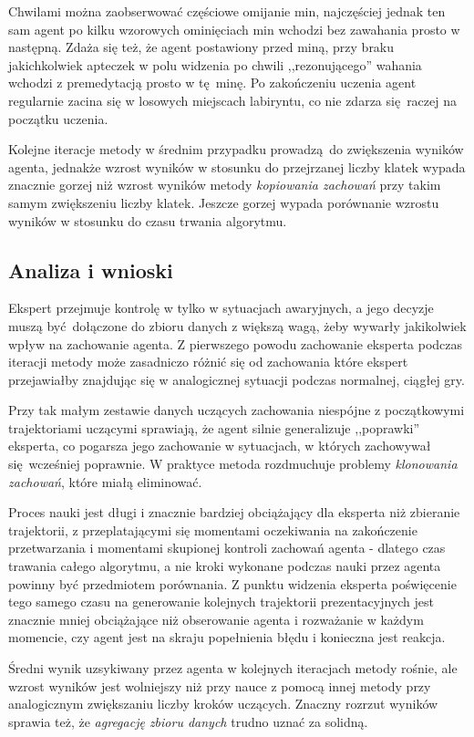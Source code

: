 Chwilami można zaobserwować częściowe omijanie min, najczęściej jednak ten sam agent po kilku wzorowych ominięciach min wchodzi bez zawahania prosto w następną. Zdaża się też, że agent postawiony przed miną, przy braku jakichkolwiek apteczek w polu widzenia po chwili ,,rezonującego'' wahania wchodzi z premedytacją prosto w tę minę. Po zakończeniu uczenia agent regularnie zacina się w losowych miejscach labiryntu, co nie zdarza się raczej na początku uczenia.

Kolejne iteracje metody w średnim przypadku prowadzą do zwiększenia wyników agenta, jednakże wzrost wyników w stosunku do przejrzanej liczby klatek wypada znacznie gorzej niż wzrost wyników metody \textit{kopiowania zachowań} przy takim samym zwiększeniu liczby klatek. Jeszcze gorzej wypada porównanie wzrostu wyników w stosunku do czasu trwania algorytmu. 

\subsection {Analiza i wnioski}

Ekspert przejmuje kontrolę w tylko w sytuacjach awaryjnych, a jego decyzje muszą być dołączone do zbioru danych z większą wagą, żeby wywarły jakikolwiek wpływ na zachowanie agenta. Z pierwszego powodu zachowanie eksperta podczas iteracji metody może zasadniczo różnić się od zachowania które ekspert przejawiałby znajdując się w analogicznej sytuacji podczas normalnej, ciągłej gry.

Przy tak małym zestawie danych uczących zachowania niespójne z początkowymi trajektoriami uczącymi sprawiają, że agent silnie generalizuje ,,poprawki'' eksperta, co pogarsza jego zachowanie w sytuacjach, w których zachowywał się wcześniej poprawnie. W praktyce metoda rozdmuchuje problemy \textit{ klonowania zachowań}, które miałą eliminować.

Proces nauki jest długi i znacznie bardziej obciążający dla eksperta niż zbieranie trajektorii, z przeplatającymi się momentami oczekiwania na zakończenie przetwarzania i momentami skupionej kontroli zachowań agenta - dlatego czas trawania całego algorytmu, a nie kroki wykonane podczas nauki przez agenta powinny być przedmiotem porównania. Z punktu widzenia eksperta poświęcenie tego samego czasu na generowanie kolejnych trajektorii prezentacyjnych jest znacznie mniej obciążające niż obserowanie agenta i rozważanie w każdym momencie, czy agent jest na skraju popełnienia błędu i konieczna jest reakcja.

Średni wynik uzsykiwany przez agenta w kolejnych iteracjach metody rośnie, ale wzrost wyników jest wolniejszy niż przy nauce z pomocą innej metody przy analogicznym zwiększaniu liczby kroków uczących. Znaczny rozrzut wyników sprawia też, że \textit{agregację zbioru danych} trudno uznać za solidną.
